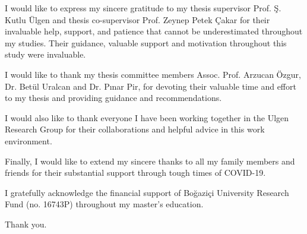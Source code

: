 I would like to express my sincere gratitude to my thesis supervisor Prof. Ş. Kutlu Ülgen and thesis co-supervisor Prof. Zeynep Petek Çakar for their invaluable help, support, and patience that cannot be underestimated throughout my studies. Their guidance, valuable support and motivation throughout this study were invaluable.

I would like to thank my thesis committee members Assoc. Prof. Arzucan Özgur, Dr. Betül Uralcan and Dr. Pınar Pir, for devoting their valuable time and effort to my thesis and providing guidance and recommendations.

I would also like to thank everyone I have been working together in the Ulgen Research Group for their collaborations and helpful advice in this work environment.

Finally, I would like to extend my sincere thanks to all my family members and friends for their substantial support through tough times of COVID-19.

I gratefully acknowledge the financial support of Boğaziçi University Research Fund (no. 16743P) throughout my master’s education.

Thank you.
